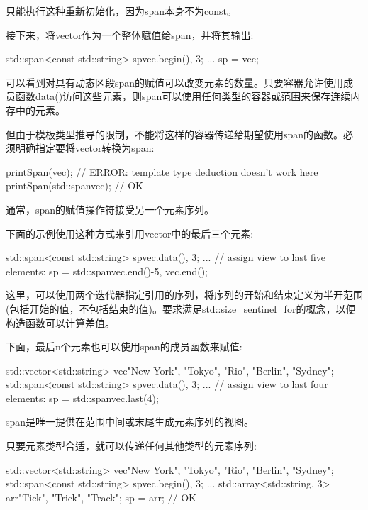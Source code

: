 只能执行这种重新初始化，因为span本身不为const。


接下来，将vector作为一个整体赋值给span，并将其输出:

\begin{cpp}
std::span<const std::string> sp{vec.begin(), 3};
...
sp = vec;
\end{cpp}

可以看到对具有动态区段span的赋值可以改变元素的数量。只要容器允许使用成员函数data()访问这些元素，则span可以使用任何类型的容器或范围来保存连续内存中的元素。

但由于模板类型推导的限制，不能将这样的容器传递给期望使用span的函数。必须明确指定要将vector转换为span:

\begin{cpp}
printSpan(vec); // ERROR: template type deduction doesn’t work here
printSpan(std::span{vec}); // OK
\end{cpp}


通常，span的赋值操作符接受另一个元素序列。

下面的示例使用这种方式来引用vector中的最后三个元素:

\begin{cpp}
std::span<const std::string> sp{vec.data(), 3};
...
// assign view to last five elements:
sp = std::span{vec.end()-5, vec.end()};
\end{cpp}

这里，可以使用两个迭代器指定引用的序列，将序列的开始和结束定义为半开范围(包括开始的值，不包括结束的值)。要求满足std::size\_sentinel\_for的概念，以便构造函数可以计算差值。

下面，最后n个元素也可以使用span的成员函数来赋值:

\begin{cpp}
std::vector<std::string> vec{"New York", "Tokyo", "Rio", "Berlin", "Sydney"};
std::span<const std::string> sp{vec.data(), 3};
...
// assign view to last four elements:
sp = std::span{vec}.last(4);
\end{cpp}

span是唯一提供在范围中间或末尾生成元素序列的视图。

只要元素类型合适，就可以传递任何其他类型的元素序列:

\begin{cpp}
std::vector<std::string> vec{"New York", "Tokyo", "Rio", "Berlin", "Sydney"};
std::span<const std::string> sp{vec.begin(), 3};
...
std::array<std::string, 3> arr{"Tick", "Trick", "Track"};
sp = arr; // OK
\end{cpp}

